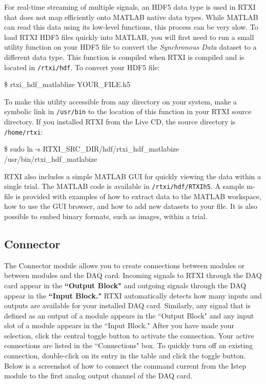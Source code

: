 For real-time streaming of multiple signals, an HDF5 data type is used in RTXI that does not map efficiently onto MATLAB native data types. While MATLAB can read this data using its low-level functions, this process can be very slow. To load RTXI HDF5 files quickly into MATLAB, you will first need to run a small utility function on your HDF5 file to convert the \emph{Synchronous Data} dataset to a different data type. This function is compiled when RTXI is compiled and is located in \texttt{/rtxi/hdf}. To convert your HDF5 file:
\begin{example}
\$ rtxi\_hdf\_matlablize YOUR\_FILE.h5
\end{example}

To make this utility accessible from any directory on your system, make a symbolic link in \texttt{/usr/bin} to the location of this function in your RTXI source directory. If you installed RTXI from the Live CD, the source directory is \texttt{/home/rtxi}:
\begin{example}
\$ sudo ln -s RTXI\_SRC\_DIR/hdf/rtxi\_hdf\_matlabize \\ \hspace{1cm} /usr/bin/rtxi\_hdf\_matlabize
\end{example}

RTXI also includes a simple MATLAB GUI for quickly viewing the data within a single trial. The MATLAB code is available in \texttt{/rtxi/hdf/RTXIh5}. A sample m-file is provided with examples of how to extract data to the MATLAB workspace, how to use the GUI browser, and how to add new datasets to your file. It is also possible to embed binary formats, such as images, within a trial.

\subsection{Connector}
\label{Connector}

The Connector module allows you to create connections between modules or between modules and the DAQ card. Incoming signals to RTXI through the DAQ card appear in the \textbf{``Output Block"} and outgoing signals through the DAQ appear in the \textbf{``Input Block."} RTXI automatically detects how many inputs and outputs are available for your installed DAQ card. Similarly, any signal that is defined as an output of a module appears in the ``Output Block" and any input slot of a module appears in the ``Input Block." After you have made your selection, click the central toggle button to activate the connection. Your active connections are listed in the ``Connections" box. To quickly turn off an existing connection, double-click on its entry in the table and click the toggle button. Below is a screenshot of how to connect the command current from the Istep module to the first analog output channel of the DAQ card.

